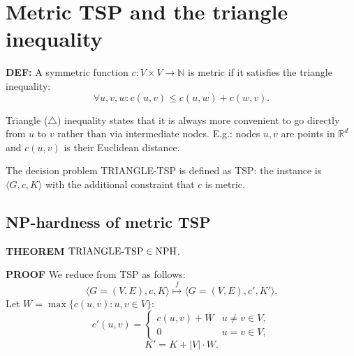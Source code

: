 \section{Metric TSP and the triangle inequality}
\begin{notesdefinition}
\textbf{DEF:} A symmetric function $c:V\times V\to\mathbb N$ is metric if it satisfies the triangle inequality:
\[\forall u,v,w:c(u,v)\leq c(u,w)+c(w,v).\]
\end{notesdefinition}
Triangle ($\triangle$) inequality states that it is always more convenient to go directly from $u$ to $v$ rather than via intermediate nodes. E.g.: nodes $u,v$ are points in $\mathbb R^d$ and $c(u,v)$ is their Euclidean distance.

The decision problem TRIANGLE-TSP is defined as TSP: the instance is $\langle G,c,K\rangle$ with the additional constraint that $c$ is metric.
\subsection{NP-hardness of metric TSP}
\begin{notestheorem}
\textbf{THEOREM} $\mathrm{TRIANGLE\text{-}TSP}\in\mathrm{NPH}$.
\end{notestheorem}
\textbf{PROOF} We reduce from TSP as follows:
\[\langle G=(V,E),c,K\rangle\overset f\longmapsto\langle G=(V,E),c',K'\rangle.\]
Let $W=\max\{c(u,v):u,v\in V\}$:
\[c'(u,v)=\begin{cases}c(u,v)+W&u\ne v\in V,\\0&u=v\in V,\end{cases}\]
\[K'=K+|V|\cdot W.\]
